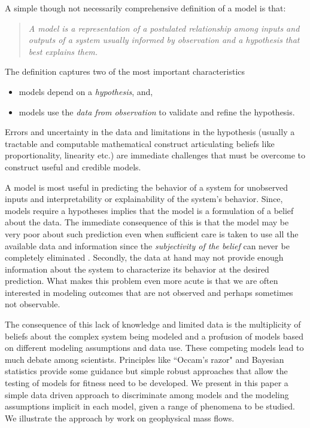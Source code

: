 \documentclass{article}
\begin{document}
A simple though not necessarily comprehensive definition of a model is that: \begin{quote}{\it A model is a representation of a postulated relationship among inputs and outputs of a system usually informed by observation and a hypothesis that best explains them.}\end{quote} The definition captures two of the most important characteristics
\begin{itemize}
\item models depend on a {\it hypothesis}, and,
\item models use the {\it data from observation} to validate and refine the hypothesis.
\end{itemize}
Errors and uncertainty in the data and limitations in the hypothesis (usually a tractable and computable mathematical construct articulating beliefs like proportionality, linearity etc.) are immediate challenges that must be overcome to construct useful and credible models.

A model is most useful in predicting the behavior of a system for unobserved inputs and interpretability or explainability of the system's behavior. Since, models require a hypotheses implies that the model is a formulation of a belief about the data. The immediate consequence of this is that the model may be very poor about such prediction even when sufficient care is taken to use all the available data and information since the {\it subjectivity of the belief} can never be completely eliminated \citep{Kennedy2001, Higdon2004}. Secondly, the data at hand may not provide enough information about the system to characterize its behavior at the desired prediction. What makes this problem even more acute is that we are often interested in modeling outcomes that are not observed and perhaps sometimes not observable.

The consequence of this lack of knowledge and limited data is the multiplicity of beliefs about the complex system being modeled and a profusion of models based on different modeling assumptions and data use. These competing models lead to much debate among scientists. Principles like ``Occam's razor" and Bayesian statistics \cite{Farrell2015} provide some guidance but simple robust approaches that allow the testing of models for fitness need to be developed. We present in this paper a simple data driven approach to discriminate among models and the modeling assumptions implicit in each model, given a range of phenomena to be studied. We illustrate the approach by work on geophysical mass flows.
\end{document}

